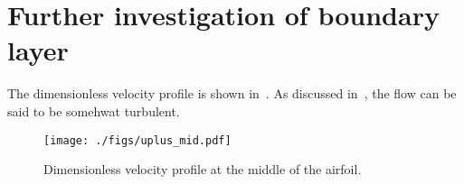 \section{Further investigation of boundary layer}
The dimensionless velocity profile is shown in~.
As discussed in~, the flow can be said to be somehwat turbulent.

\begin{figure}
    \centering
    \texttt{[image: ./figs/uplus\_mid.pdf]}
    \caption{Dimensionless velocity profile at the middle of the airfoil.}
    \label{fig:uplus_mid}
\end{figure}
